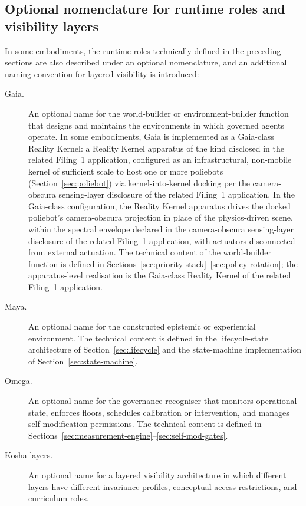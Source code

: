 \documentclass[a4paper,12pt]{article}
\newcommand{\RK}{Reality Kernel\xspace}
\begin{document}

\subsection{Optional nomenclature for runtime roles and visibility
  layers}
\label{sec:optional-nomenclature}

In some embodiments, the runtime roles technically defined in the
preceding sections are also described under an optional nomenclature,
and an additional naming convention for layered visibility is introduced:
\begin{description}
  \item[Gaia.] An optional name for the world-builder or
    environment-builder function that designs and maintains the
    environments in which governed agents operate. In some
    embodiments, Gaia is implemented as a Gaia-class \RK:
    a \RK apparatus of the kind disclosed in the related
    Filing~1 application, configured as an infrastructural,
    non-mobile kernel of sufficient scale to host one or more
    poliebots (Section~\ref{sec:poliebot}) via kernel-into-kernel
    docking per the camera-obscura sensing-layer disclosure of the related Filing~1 application. In the Gaia-class configuration,
    the \RK apparatus drives the docked poliebot's
    camera-obscura projection in place of the physics-driven scene,
    within the spectral envelope declared in the camera-obscura sensing-layer disclosure of the related Filing~1 application, with actuators disconnected from external
    actuation. The technical content of the world-builder function is
    defined in
    Sections~\ref{sec:priority-stack}--\ref{sec:policy-rotation};
    the apparatus-level realisation is the Gaia-class \RK
    of the related Filing~1 application.
  \item[Maya.] An optional name for the constructed epistemic or
    experiential environment. The technical content is defined in
    the lifecycle-state architecture of Section~\ref{sec:lifecycle}
    and the state-machine implementation of Section~\ref{sec:state-machine}.
  \item[Omega.] An optional name for the governance recogniser that
    monitors operational state, enforces floors, schedules
    calibration or intervention, and manages self-modification
    permissions. The technical content is defined in
    Sections~\ref{sec:measurement-engine}--\ref{sec:self-mod-gates}.
  \item[Kosha layers.] An optional name for a layered visibility
    architecture in which different layers have different invariance
    profiles, conceptual access restrictions, and curriculum roles.
\end{description}
\end{document}
